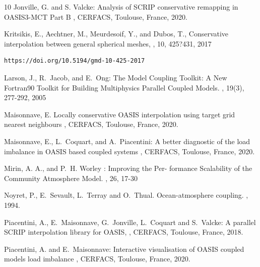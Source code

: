 \begin{thebibliography}{10}
Jonville, G. and S. Valcke:
\newblock Analysis of SCRIP conservative remapping in OASIS3-MCT
Part B
,
\newblock CERFACS, Toulouse, France, 2020.

Kritsikis, E., Aechtner, M., Meurdesoif, Y., and Dubos, T., 
\newblock Conservative interpolation between general spherical meshes,
, 10, 425?431, 2017
\newblock  \begin{verbatim}https://doi.org/10.5194/gmd-10-425-2017\end{verbatim}

Larson, J., R.~Jacob, and E.~Ong:
\newblock The Model Coupling Toolkit: A New Fortran90 Toolkit for Building Multiphysics Parallel Coupled Models.
, 19(3), 277-292, 2005

Maisonnave, E.
\newblock Locally conservative OASIS interpolation using target grid nearest neighbours
,
\newblock CERFACS, Toulouse, France, 2020.

Maisonnave, E., L.~Coquart, and A.~Piacentini:
\newblock A better diagnostic of the load imbalance in OASIS based coupled systems
,
\newblock CERFACS, Toulouse, France, 2020.

Mirin, A. A., and P.~H. Worley :
\newblock Improving the Per- formance Scalability of the Community Atmosphere Model.
, 26, 17-30

Noyret, P., E.~Sevault, L.~Terray and O.~Thual.
\newblock Ocean-atmosphere coupling.
,
1994.

Piacentini, A., E.~Maisonnave, G.~Jonville, L.~Coquart and S.~Valcke:
\newblock A parallel SCRIP interpolation library for OASIS,
,
\newblock CERFACS, Toulouse, France, 2018.

Piacentini, A. and E.~Maisonnave: 
\newblock Interactive visualisation of OASIS coupled models load imbalance
,
\newblock CERFACS, Toulouse, France, 2020.


\end{thebibliography}
